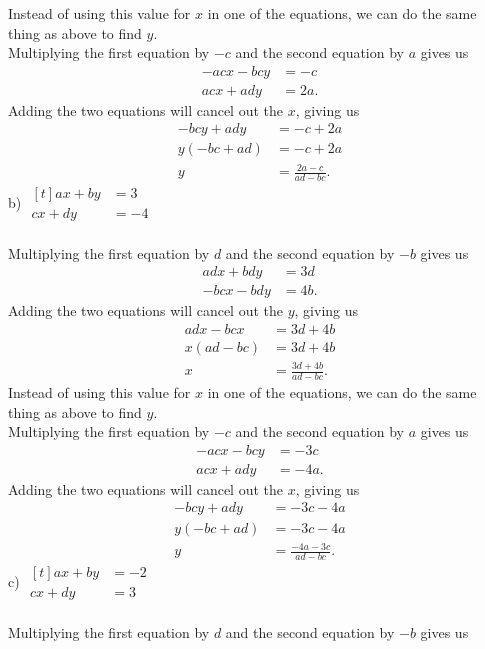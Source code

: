 \documentclass[12pt]{article}
\begin{document}
Instead of using this value for $x$ in one of the equations, we can do the same thing as above to find $y$. \\
Multiplying the first equation by $-c$ and the second equation by $a$ gives us
\begin{align*}
-acx-bcy&=-c \\
acx+ady&=2a.
\end{align*}
Adding the two equations will cancel out the $x$, giving us
\begin{align*}
-bcy+ady&=-c+2a \\
y(-bc+ad)&=-c+2a \\
y&=\displaystyle \frac{2a-c}{ad-bc}.
\end{align*}
b) $\begin{aligned}[t]
ax+by&=3 \\
cx+dy&=-4
\end{aligned}$ \\
\\
Multiplying the first equation by $d$ and the second equation by $-b$ gives us
\begin{align*}
adx+bdy&=3d \\
-bcx-bdy&=4b.
\end{align*}
Adding the two equations will cancel out the $y$, giving us
\begin{align*}
adx-bcx&=3d+4b \\
x(ad-bc)&=3d+4b \\
x&=\displaystyle \frac{3d+4b}{ad-bc}.
\end{align*}
Instead of using this value for $x$ in one of the equations, we can do the same thing as above to find $y$. \\
Multiplying the first equation by $-c$ and the second equation by $a$ gives us
\begin{align*}
-acx-bcy&=-3c \\
acx+ady&=-4a.
\end{align*}
Adding the two equations will cancel out the $x$, giving us
\begin{align*}
-bcy+ady&=-3c-4a \\
y(-bc+ad)&=-3c-4a \\
y&=\displaystyle \frac{-4a-3c}{ad-bc}.
\end{align*}
c) $\begin{aligned}[t]
ax+by&=-2 \\
cx+dy&=3
\end{aligned}$ \\
\\
Multiplying the first equation by $d$ and the second equation by $-b$ gives us
\end{document}
